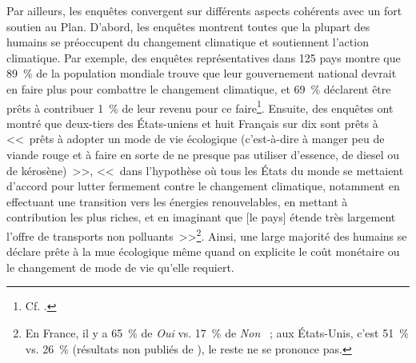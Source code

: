 \documentclass[a5paper,french]{memoir}
\begin{document}
Par ailleurs, les enquêtes convergent sur différents aspects cohérents avec un fort soutien au Plan. D'abord, les enquêtes montrent toutes que la plupart des humains se préoccupent du changement climatique et soutiennent l'action climatique. Par exemple, des enquêtes représentatives dans 125 pays montre que 89~\% de la population mondiale trouve que leur gouvernement national devrait en faire plus pour combattre le changement climatique, et 69~\% déclarent être prêts à contribuer 1~\% de leur revenu pour ce faire\footnote{Cf. \cite{andre_actual_2024}.}. %
Ensuite, des enquêtes ont montré que deux-tiers des États-uniens et huit Français sur dix sont prêts à <<~prêts à adopter un mode de vie écologique (c'est-à-dire à manger peu de viande rouge et à faire en sorte de ne presque pas utiliser d'essence, de diesel ou de
kérosène)~>>, <<~dans l'hypothèse où tous les États du monde se mettaient d'accord pour lutter fermement contre le changement climatique, notamment en effectuant une
transition vers les énergies renouvelables, en mettant à contribution les plus riches, et en imaginant que [le pays] étende très largement l'offre de transports non polluants~>>\footnote{En France, il y a 65~\% de \textit{Oui} vs. 17~\% de \textit{Non} \citep{douenne_french_2020}~; aux États-Unis, c'est 51~\% vs. 26~\% (résultats non publiés de \citealp{dechezlepretre_fighting_2022}), le reste ne se prononce pas.}. %
Ainsi, une large majorité des humains se déclare prête à la mue écologique même quand on explicite le coût monétaire ou le changement de mode de vie qu'elle requiert. 
\end{document}
